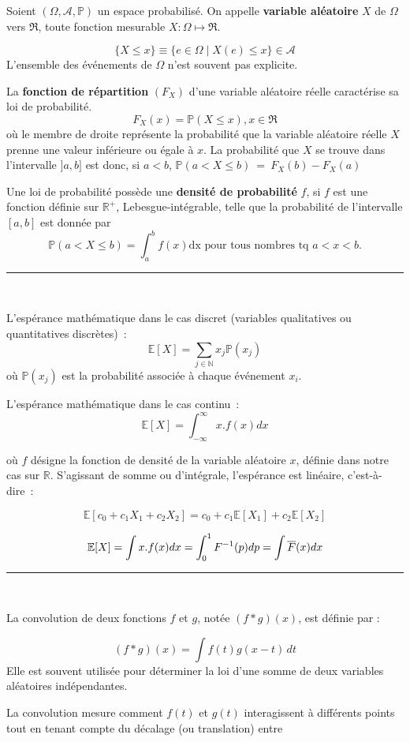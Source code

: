 \begin{f}
	
	Soient $ (\Omega, \mathcal{A}, \mathbb{P})$ un espace probabilisé. On appelle \textbf{variable aléatoire} $X$ de $\Omega$ vers $ \Re$, toute fonction mesurable $X:\Omega\mapsto \Re$.
	
	$$\lbrace X\leq x \rbrace\equiv \lbrace e\in \Omega \mid X(e)\leq x \rbrace \in   \mathcal{A}$$
	L'ensemble des événements de $\Omega$ n'est souvent pas explicite.
	
	La \textbf{fonction de répartition} $(F_X)$ d'une variable aléatoire réelle caractérise sa loi de probabilité. 
	$$
	F_X(x)=\mathbb {P}(X\leq x), x\in \Re
	$$
	où le membre de droite représente la probabilité que la variable aléatoire réelle $X$ prenne une valeur inférieure ou égale à $x$.
	La probabilité que $X$ se trouve dans l'intervalle $]a, b]$ est donc, si $a< b$,
	$
	\mathbb{P}(a< X\leq b)\ =\ F_X(b)-F_X(a)
	$
	
	Une loi de probabilité possède une \textbf{densité de probabilité} $f$, si $f$ est une fonction définie sur $\mathbb{R}^{+}$,  Lebesgue-intégrable, telle que la probabilité de l'intervalle $[a, b]$ est donnée par
	$$
	\mathbb{P}(a< X\leq b)=\int_a^b f(x) \mathrm{dx} \mbox{ pour tous nombres tq }a<x<b.
	$$
\end{f}
\hrule
\begin{f}[Espérance]{\ }
	
	L'espérance mathématique dans le cas discret (variables qualitatives ou quantitatives discrètes)~:
	$$
	\mathbb{E}[X]=\sum_{j\in \mathbb{N}}x_j\mathbb{P}(x_j)
	$$
	où $\mathbb{P}(x_j)$ est la probabilité associée à chaque événement $x_i$.
	
	L'espérance mathématique dans le cas continu~:
	$$
	\mathbb{E}[X]=\int_{-\infty}^{\infty} x. f(x)dx
	$$
	
	où $f$ désigne la fonction de densité de la variable aléatoire $x$, définie dans notre cas sur $\mathbb{R}$.
	S'agissant de somme ou d'intégrale, l'espérance est linéaire, c'est-à-dire~:
	
	$$\mathbb{E}[c_0+c_1X_1+c_2X_2]=c_0+c_1\mathbb{E}[X_1]+c_2\mathbb{E}[X_2]$$
	
	$$
	\mathbb{E}[X]=\int x.f(x)dx =\int_0^1 F^{-1}(p)dp= \int \overline{F}(x)dx\\
	$$ 
\end{f}
\hrule
\begin{f}{\ }
	
	La convolution de deux fonctions \( f \) et \( g \), notée \( (f * g)(x) \), est définie par :
	
	\[
	(f * g)(x) = \int f(t) g(x - t) \, dt
	\]
	Elle est souvent utilisée pour déterminer la loi d'une somme de deux variables aléatoires indépendantes.
	
	La convolution mesure comment \( f(t) \) et \( g(t) \) interagissent à différents points tout en tenant compte du décalage (ou translation) entre 
\end{f}
